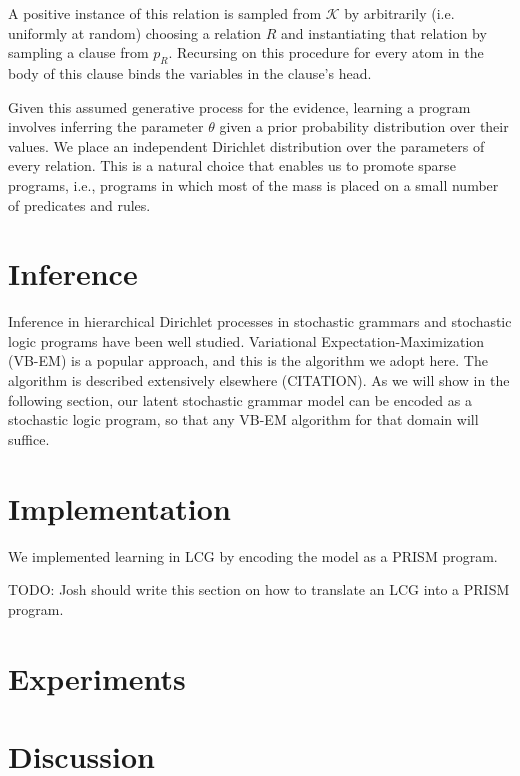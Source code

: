 \documentclass{article}
\begin{document}
A positive instance of this relation is sampled from $\mathcal{K}$ by
arbitrarily (i.e. uniformly at random) choosing a relation $R$ and
instantiating that relation by sampling a clause from $p_R$. Recursing
on this procedure for every atom in the body of this clause binds the
variables in the clause's head. 

Given this assumed generative process for the evidence, learning a
program involves inferring the parameter $\theta$ given a prior
probability distribution over their values. We place an independent
Dirichlet distribution over the parameters of every relation. This is
a natural choice that enables us to promote sparse programs, i.e.,
programs in which most of the mass is placed on a small number of
predicates and rules.

\section{Inference}
Inference in hierarchical Dirichlet processes in stochastic grammars
and stochastic logic programs have been well studied. Variational
Expectation-Maximization (VB-EM) is a popular approach, and this is
the algorithm we adopt here. The algorithm is described extensively
elsewhere (CITATION). As we will show in the following section, our
latent stochastic grammar model can be encoded as a stochastic logic
program, so that any VB-EM algorithm for that domain will suffice. 

\section{Implementation}
We implemented learning in LCG by encoding the model as a PRISM program.

TODO: Josh should write this section on how to translate an LCG into a
PRISM program.

\section{Experiments}
\section{Discussion}
\end{document}
